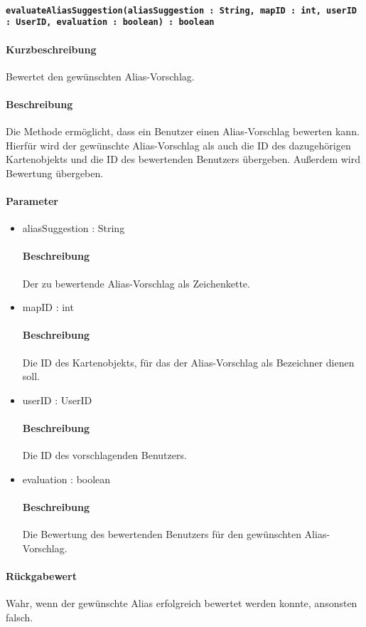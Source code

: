 \paragraph{\texttt{evaluateAliasSuggestion(aliasSuggestion : String, mapID : int, userID : UserID, evaluation : boolean) : boolean}}%
\paragraph*{Kurzbeschreibung}
Bewertet den gewünschten Alias-Vorschlag.
\paragraph*{Beschreibung}
Die Methode ermöglicht, dass ein Benutzer einen Alias-Vorschlag bewerten kann. 
Hierfür wird der gewünschte Alias-Vorschlag als auch die ID des dazugehörigen Kartenobjekts und die ID des bewertenden Benutzers übergeben.
Außerdem wird Bewertung übergeben.
\paragraph*{Parameter}
\begin{itemize}
	\item aliasSuggestion : String
		\paragraph*{Beschreibung}
		Der zu bewertende Alias-Vorschlag als Zeichenkette.
	\item mapID : int
		\paragraph*{Beschreibung}
		Die ID des Kartenobjekts, für das der Alias-Vorschlag als Bezeichner dienen soll.
	\item userID : UserID
		\paragraph*{Beschreibung}
		Die ID des vorschlagenden Benutzers.
	\item evaluation : boolean
		\paragraph*{Beschreibung}
		Die Bewertung des bewertenden Benutzers für den gewünschten Alias-Vorschlag.
\end{itemize}
\paragraph*{Rückgabewert}
Wahr, wenn der gewünschte Alias erfolgreich bewertet werden konnte, ansonsten falsch.
